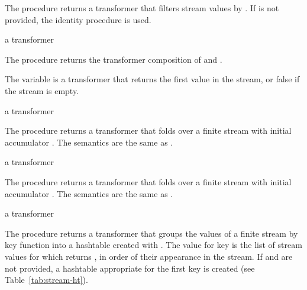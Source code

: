 The  procedure returns a transformer that filters stream values by
. If  is not provided, the identity procedure is used.

\begin{procedure}
\end{procedure}
\returns{} a transformer

The  procedure returns the transformer composition of  and .

\begin{variable}
\end{variable}
\antipar

The  variable is a transformer that returns the first value in the stream, or
false if the stream is empty.

\begin{procedure}
\end{procedure}
\returns{} a transformer

The  procedure returns a transformer that folds  over a
finite stream with initial accumulator . The semantics are the same as
.

\begin{procedure}
\end{procedure}
\returns{} a transformer

The  procedure returns a transformer that folds  over a
finite stream with initial accumulator . The semantics are the same as
.

\begin{procedure}
\end{procedure}
\returns{} a transformer

The  procedure returns a transformer that groups the values of a finite
stream by key function  into a hashtable created with . The value for key  is the list of stream values for
which  returns , in order of their appearance in the stream. If
 and  are not provided, a hashtable appropriate for the first key is
created (see Table~\ref{tab:stream-ht}).

